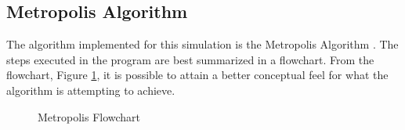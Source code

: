 \documentclass[a4paper]{article}
\begin{document}
\subsection{Metropolis Algorithm}
The algorithm implemented for this simulation is the Metropolis
Algorithm \cite{Metropolis:53}. The steps executed in the program are best summarized
in a flowchart. From the flowchart, Figure \ref{fig:flowchart}, it is possible to attain a
better conceptual feel for what the algorithm is attempting to
achieve. 

\begin{figure}[htb]
  \centering 
\caption{Metropolis Flowchart}\label{fig:flowchart}
\end{figure}

\end{document}
